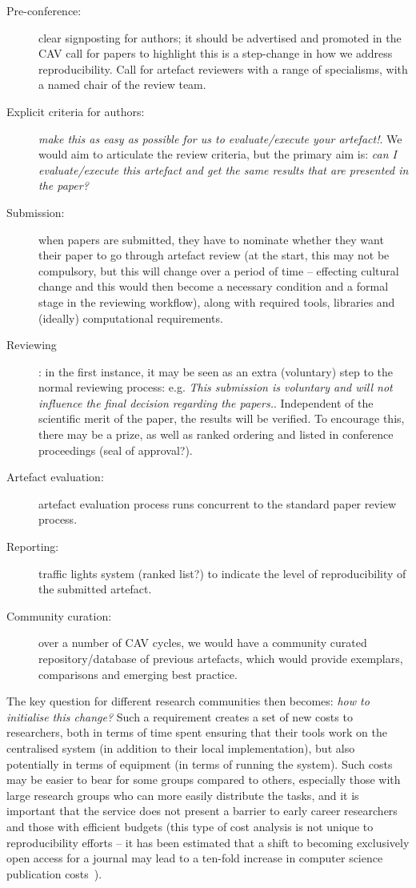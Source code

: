 \documentclass{llncs}
\begin{document}
\begin{description}
\item[Pre-conference:] clear signposting for authors; it should be
advertised and promoted in the CAV call for papers to highlight this
is a step-change in how we address reproducibility. Call for artefact
reviewers with a range of specialisms, with a named chair of the review team.
\item[Explicit criteria for authors:] {\emph{make this as
easy as possible for us to evaluate/execute your artefact!}}. We would
aim to articulate the review criteria, but the primary aim is: {\emph{can I evaluate/execute this
  artefact and get the same results that are presented in the paper?}}
\item[Submission:] when papers are submitted, they have to nominate whether they
  want their paper to go through artefact review (at the start, this
  may not be compulsory, but this will change over a period of
time -- effecting cultural change and this would then become a
necessary condition and a formal stage in the reviewing workflow),
  along with required tools, libraries and (ideally) computational requirements.
\item[Reviewing]: in the first instance, it may be seen as an extra
(voluntary) step to the normal reviewing process: e.g. {\emph{This
submission is voluntary and will not influence the final decision
regarding the papers.}}. Independent of the scientific merit of the
paper, the results will be verified. To encourage this, there may be a
prize, as well as ranked ordering and listed in conference proceedings
(seal of approval?).
\item[Artefact evaluation:] artefact evaluation process runs concurrent to the
  standard paper review process.
\item[Reporting:] traffic lights system (ranked list?) to indicate the level of
  reproducibility of the submitted artefact. 
\item[Community curation:] over a number of CAV cycles, we would have a
  community curated repository/database of previous artefacts, which
  would provide exemplars, comparisons and emerging best practice.
\end{description}

The key question for different research communities then becomes:
{\emph{how to initialise this change?}} Such a requirement creates a
set of new costs to researchers, both in terms of time spent ensuring
that their tools work on the centralised system (in addition to their
local implementation), but also potentially in terms of equipment (in
terms of running the system). Such costs may be easier to bear for
some groups compared to others, especially those with large research
groups who can more easily distribute the tasks, and it is important
that the service does not present a barrier to early career
researchers and those with efficient budgets (this type of cost
analysis is not unique to reproducibility efforts -- it has been
estimated that a shift to becoming exclusively open access for a
journal may lead to a ten-fold increase in computer science
publication costs~\cite{vardi-cacm-2014}).
\end{document}
